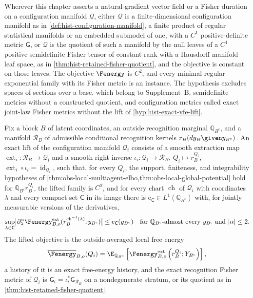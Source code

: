 \label{hyp:hist-regular-metric-domain}%
Wherever this chapter asserts a natural-gradient vector field or a Fisher duration on a
configuration manifold $\mathcal Q$, either $\mathcal Q$ is a finite-dimensional
configuration manifold as in \cref{def:hist-configuration-manifold}, a finite product of
regular statistical manifolds or an embedded submodel of one, with a $C^1$
positive-definite metric $\mathsf G$, or $\mathcal Q$ is the quotient of such a manifold
by the null leaves of a $C^1$ positive-semidefinite Fisher tensor of constant rank with a
Hausdorff manifold leaf space, as in \cref{thm:hist-retained-fisher-quotient}, and the
objective is constant on those leaves.  The objective $\Fenergy$ is $C^2$, and every
minimal regular exponential family with its Fisher metric is an instance.  The hypothesis
excludes spaces of sections over a base, which belong to Supplement~B, semidefinite
metrics without a constructed quotient, and configuration metrics called exact joint-law
Fisher metrics without the lift of \cref{hyp:hist-exact-vfe-lift}.

Fix a block $B$ of latent coordinates, an outside recognition marginal
$\mathbb Q_{B^c}$, and a manifold $\mathscr R_B$ of admissible conditional recognition
kernels $r_B(dy_B\given y_{B^c})$.  An exact lift of the configuration manifold
$\mathcal Q_i$ consists of a smooth extraction map
$\operatorname{ext}_i:\mathscr R_B\to\mathcal Q_i$ and a smooth right inverse
$\iota_i:\mathcal Q_i\to\mathscr R_B$, $Q_i\mapsto r_B^{Q_i}$,
$\operatorname{ext}_i\circ\iota_i=\operatorname{id}_{\mathcal Q_i}$, such that, for every
$Q_i$, the support, finiteness, and integrability hypotheses of
\cref{thm:obs-local-multiagent-elbo,thm:obs-local-global-potential} hold for
$\mathbb Q_{B^c}r_B^{Q_i}$, the lifted family is $C^2$, and for every chart
$\operatorname{ch}$ of $\mathcal Q_i$ with coordinates $\lambda$ and every compact set
$\mathsf C$ in its image there is $\mathrm e_{\mathsf C}\in L^1(\mathbb Q_{B^c})$ with,
for jointly measurable versions of the derivatives,
\begin{equation}
\sup_{\lambda\in\mathsf C}
\bigl|\partial_\lambda^\alpha\Fenergy^{\rm ext}_{B,o}
(r_B^{\operatorname{ch}^{-1}(\lambda)};y_{B^c})\bigr|
\leq\mathrm e_{\mathsf C}(y_{B^c})
\quad\text{for }\mathbb Q_{B^c}\text{-almost every }y_{B^c}
\text{ and }|\alpha|\leq2.
\label{eq:hist-chartwise-vfe-envelope}
\end{equation}
The lifted objective is the outside-averaged local free energy
\begin{equation}
\overline{\Fenergy}_{B,o}(Q_i)
=\E_{\mathbb Q_{B^c}}\left[\Fenergy^{\rm ext}_{B,o}\left(r_B^{Q_i};Y_{B^c}\right)\right],
\label{eq:hist-outside-averaged-local-vfe}
\end{equation}
a history of it is an exact free-energy history, and the exact recognition Fisher metric
of $\mathcal Q_i$ is $\mathsf G_i=\iota_i^*\mathsf G_{\mathscr R_B}$ on a nondegenerate
stratum, or its quotient as in \cref{thm:hist-retained-fisher-quotient}.

